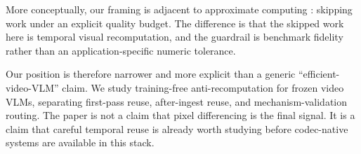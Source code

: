 More conceptually, our framing is adjacent to approximate computing
\cite{rinardapprox}: skipping work under an explicit quality budget. The
difference is that the skipped work here is temporal visual recomputation, and
the guardrail is benchmark fidelity rather than an application-specific numeric
tolerance.

Our position is therefore narrower and more explicit than a generic
``efficient-video-VLM'' claim. We study training-free anti-recomputation for
frozen video VLMs, separating first-pass reuse, after-ingest reuse, and
mechanism-validation routing. The paper is not a claim that pixel differencing
is the final signal. It is a claim that careful temporal reuse is already worth
studying before codec-native systems are available in this stack.
